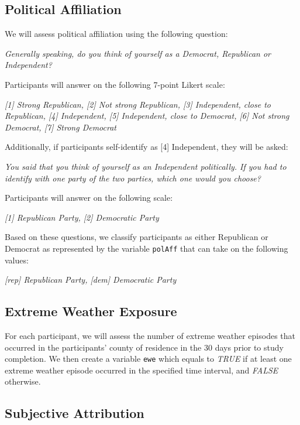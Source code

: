 \documentclass[
  letterpaper,
  DIV=11,
  numbers=noendperiod]{scrartcl}
\begin{document}
\subsection{Political Affiliation}\label{political-affiliation}

We will assess political affiliation using the following question:

\emph{Generally speaking, do you think of yourself as a Democrat,
Republican or Independent?}

Participants will answer on the following 7-point Likert scale:

\emph{{[}1{]} Strong Republican, {[}2{]} Not strong Republican, {[}3{]}
Independent, close to Republican, {[}4{]} Independent, {[}5{]}
Independent, close to Democrat, {[}6{]} Not strong Democrat, {[}7{]}
Strong Democrat}

Additionally, if participants self-identify as {[}4{]} Independent, they
will be asked:

\emph{You said that you think of yourself as an Independent politically.
If you had to identify with one party of the two parties, which one
would you choose?}

Participants will answer on the following scale:

\emph{{[}1{]} Republican Party, {[}2{]} Democratic Party}

Based on these questions, we classify participants as either Republican
or Democrat as represented by the variable \texttt{polAff} that can take
on the following values:

\emph{{[}rep{]} Republican Party, {[}dem{]} Democratic Party}

\subsection{Extreme Weather Exposure}\label{extreme-weather-exposure}

For each participant, we will assess the number of extreme weather
episodes that occurred in the participants' county of residence in the
30 days prior to study completion. We then create a variable
\texttt{ewe} which equals to \emph{TRUE} if at least one extreme weather
episode occurred in the specified time interval, and \emph{FALSE}
otherwise.

\subsection{Subjective Attribution}\label{subjective-attribution}
\end{document}
